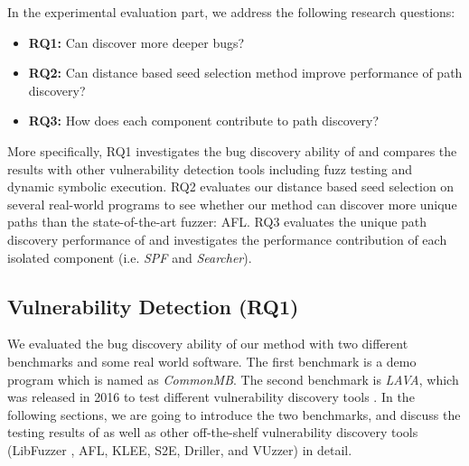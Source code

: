 In the experimental evaluation part, we address the following 
research questions:
\begin{itemize}
\setlength{\itemsep}{0pt}
\item {\textbf{RQ1:} Can \prototype discover more deeper bugs?}
\item {\textbf{RQ2:} Can distance based seed selection method 
	improve performance of path discovery?}
\item {\textbf{RQ3:} How does each component contribute to 
	path discovery?}
\end{itemize}

More specifically, RQ1 investigates the bug discovery ability of 
\prototype and compares the results with other vulnerability 
detection tools including fuzz testing and dynamic symbolic execution. 
RQ2 evaluates our distance based seed selection on several 
real-world programs to see whether our method can discover more 
unique paths than the state-of-the-art fuzzer: AFL. RQ3 evaluates 
the unique path discovery performance of \prototype and 
investigates the performance contribution of each isolated 
component (i.e. \textit{SPF} and \textit{Searcher}).


\subsection{Vulnerability Detection (RQ1)}
We evaluated the bug discovery ability of our method with two 
different benchmarks and some real world software. The first 
benchmark is a demo program which is named as \emph{CommonMB}. 
The second benchmark is \emph{LAVA}, which was released in 2016 
to test different vulnerability discovery tools \cite{dolan2016lava}. 
In the following sections, we are going to introduce the 
two benchmarks, and discuss the testing results of \prototype
as well as other off-the-shelf vulnerability discovery tools 
(LibFuzzer \cite{libfuzzer}, AFL, KLEE, S2E, Driller, and VUzzer) in detail.

